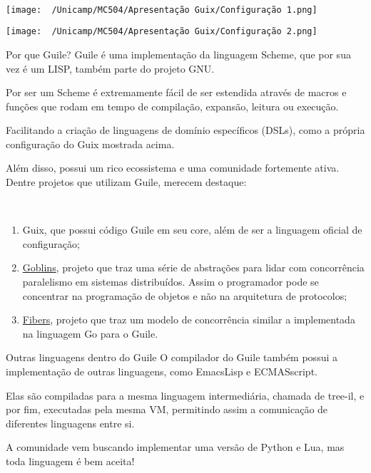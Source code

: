 \documentclass[bigger]{beamer}
\begin{document}
\begin{frame}[label={sec:orgdc9eb75}]{⁤}
\begin{minipage}[c]{0.5\textwidth}
  \texttt{[image: ~/Unicamp/MC504/Apresentação Guix/Configuração 1.png]}
\end{minipage}%
\hfill
\begin{minipage}[c]{0.5\textwidth}
  \texttt{[image: ~/Unicamp/MC504/Apresentação Guix/Configuração 2.png]}
\end{minipage}
\end{frame}
\begin{frame}[label={sec:org6bf7dee}]{Por que Guile?}
Guile é uma implementação da linguagem Scheme, que por sua vez é um LISP, também parte do projeto GNU.

Por ser um Scheme é extremamente fácil de ser estendida através de macros e funções que rodam em tempo de
compilação, expansão, leitura ou execução.

Facilitando a criação de linguagens de domínio específicos (DSLs), como a própria configuração do Guix mostrada
acima.

Além disso, possui um rico ecossistema e uma comunidade fortemente ativa. Dentre projetos que utilizam Guile,
merecem destaque:
\end{frame}
\begin{frame}[label={sec:org949a59c}]{⁤}
\begin{enumerate}
\item Guix, que possui código Guile em seu core, além de ser a linguagem oficial de configuração;
\item \href{https://spritely.institute/goblins/}{Goblins}, projeto que traz uma série de abstrações para lidar com concorrência paralelismo em sistemas
distribuídos. Assim o programador pode se concentrar na programação de objetos e não na
arquitetura de protocolos;
\item \href{https://github.com/wingo/fibers}{Fibers}, projeto que traz um modelo de concorrência similar a implementada na linguagem Go para o Guile.
\end{enumerate}
\end{frame}
\begin{frame}[label={sec:orgfe6055a}]{Outras linguagens dentro do Guile}
O compilador do Guile também possui a implementação de outras linguagens, como EmacsLisp e ECMASscript.

Elas são compiladas para a mesma linguagem intermediária, chamada de tree-il, e por fim, executadas pela
mesma VM, permitindo assim a comunicação de diferentes linguagens entre si.

A comunidade vem buscando implementar uma versão de Python e Lua, mas toda linguagem é bem aceita!
\end{frame}
\end{document}
